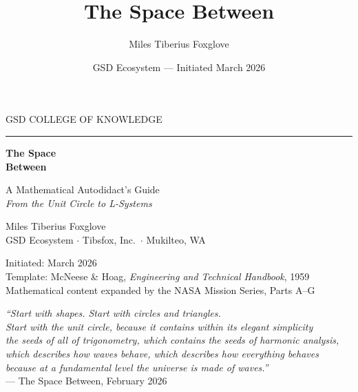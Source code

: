 \documentclass[11pt,letterpaper]{book}
\title{The Space Between}
\author{Miles Tiberius Foxglove}
\date{GSD Ecosystem --- Initiated March 2026}
\begin{document}
\frontmatter
\thispagestyle{empty}
\begin{center}
\vspace*{3cm}

{\Large\sffamily\textcolor{subtlegray}{GSD COLLEGE OF KNOWLEDGE}}

\vspace{0.5cm}
\textcolor{bordergray}{\rule{8cm}{0.4pt}}

\vspace{2cm}
{\fontsize{36}{44}\selectfont\bfseries\sffamily\textcolor{primary}{The Space\\[0.3em]Between}}

\vspace{1cm}
{\Large\sffamily\textcolor{secondary}{A Mathematical Autodidact's Guide}}\\[0.5em]
{\large\sffamily\itshape\textcolor{subtlegray}{From the Unit Circle to L-Systems}}

\vspace{3cm}
{\normalsize\sffamily\textcolor{primary}{Miles Tiberius Foxglove}}\\[0.3em]
{\small\sffamily\textcolor{subtlegray}{GSD Ecosystem $\cdot$ Tibsfox, Inc.\ $\cdot$ Mukilteo, WA}}

\vspace{2cm}
{\small\sffamily\textcolor{subtlegray}{Initiated: March 2026}}\\
{\small\sffamily\textcolor{subtlegray}{Template: McNeese \& Hoag, \textit{Engineering and Technical Handbook}, 1959}}\\
{\small\sffamily\textcolor{subtlegray}{Mathematical content expanded by the NASA Mission Series, Parts A--G}}

\vspace{3cm}
\begin{center}
\colorbox{lightprimary}{\parbox{12cm}{\centering\small\sffamily\textcolor{primary}{%
\textit{``Start with shapes. Start with circles and triangles.\\
Start with the unit circle, because it contains within its elegant simplicity\\
the seeds of all of trigonometry, which contains the seeds of harmonic analysis,\\
which describes how waves behave, which describes how everything behaves\\
because at a fundamental level the universe is made of waves.''}\\[0.3em]
--- The Space Between, February 2026
}}}
\end{center}
\end{center}
\newpage
\end{document}
